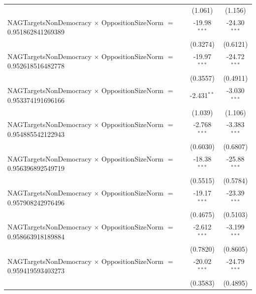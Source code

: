 \begin{tabular}{lcc}
                                                                                & (1.061)              & (1.156)\\   
   NAGTargetsNonDemocracy $\times$ OppositionSizeNorm $=$ 0.951862841269389     & -19.98$^{***}$       & -24.30$^{***}$\\   
                                                                                & (0.3274)             & (0.6121)\\   
   NAGTargetsNonDemocracy $\times$ OppositionSizeNorm $=$ 0.952618516482778     & -19.97$^{***}$       & -24.72$^{***}$\\   
                                                                                & (0.3557)             & (0.4911)\\   
   NAGTargetsNonDemocracy $\times$ OppositionSizeNorm $=$ 0.953374191696166     & -2.431$^{**}$        & -3.030$^{***}$\\   
                                                                                & (1.039)              & (1.106)\\   
   NAGTargetsNonDemocracy $\times$ OppositionSizeNorm $=$ 0.954885542122943     & -2.768$^{***}$       & -3.383$^{***}$\\   
                                                                                & (0.6030)             & (0.6807)\\   
   NAGTargetsNonDemocracy $\times$ OppositionSizeNorm $=$ 0.956396892549719     & -18.38$^{***}$       & -25.88$^{***}$\\   
                                                                                & (0.5515)             & (0.5784)\\   
   NAGTargetsNonDemocracy $\times$ OppositionSizeNorm $=$ 0.957908242976496     & -19.17$^{***}$       & -23.39$^{***}$\\   
                                                                                & (0.4675)             & (0.5103)\\   
   NAGTargetsNonDemocracy $\times$ OppositionSizeNorm $=$ 0.958663918189884     & -2.612$^{***}$       & -3.199$^{***}$\\   
                                                                                & (0.7820)             & (0.8605)\\   
   NAGTargetsNonDemocracy $\times$ OppositionSizeNorm $=$ 0.959419593403273     & -20.02$^{***}$       & -24.79$^{***}$\\   
                                                                                & (0.3583)             & (0.4895)\\   

\end{tabular}
